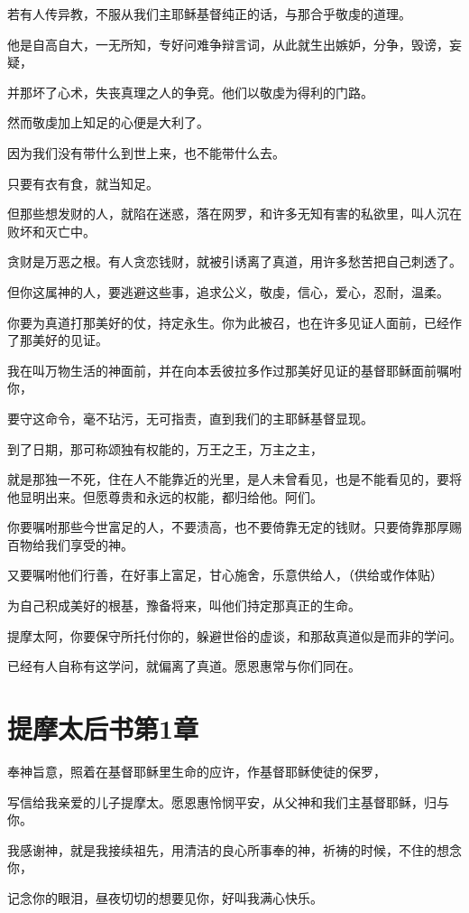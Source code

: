 \documentclass[12pt,oneside]{book}
\begin{document}
若有人传异教，不服从我们主耶稣基督纯正的话，与那合乎敬虔的道理。

他是自高自大，一无所知，专好问难争辩言词，从此就生出嫉妒，分争，毁谤，妄疑，

并那坏了心术，失丧真理之人的争竞。他们以敬虔为得利的门路。

然而敬虔加上知足的心便是大利了。

因为我们没有带什么到世上来，也不能带什么去。

只要有衣有食，就当知足。

但那些想发财的人，就陷在迷惑，落在网罗，和许多无知有害的私欲里，叫人沉在败坏和灭亡中。

贪财是万恶之根。有人贪恋钱财，就被引诱离了真道，用许多愁苦把自己刺透了。

但你这属神的人，要逃避这些事，追求公义，敬虔，信心，爱心，忍耐，温柔。

你要为真道打那美好的仗，持定永生。你为此被召，也在许多见证人面前，已经作了那美好的见证。

我在叫万物生活的神面前，并在向本丢彼拉多作过那美好见证的基督耶稣面前嘱咐你，

要守这命令，毫不玷污，无可指责，直到我们的主耶稣基督显现。

到了日期，那可称颂独有权能的，万王之王，万主之主，

就是那独一不死，住在人不能靠近的光里，是人未曾看见，也是不能看见的，要将他显明出来。但愿尊贵和永远的权能，都归给他。阿们。

你要嘱咐那些今世富足的人，不要渍高，也不要倚靠无定的钱财。只要倚靠那厚赐百物给我们享受的神。

又要嘱咐他们行善，在好事上富足，甘心施舍，乐意供给人，（供给或作体贴）

为自己积成美好的根基，豫备将来，叫他们持定那真正的生命。

提摩太阿，你要保守所托付你的，躲避世俗的虚谈，和那敌真道似是而非的学问。

已经有人自称有这学问，就偏离了真道。愿恩惠常与你们同在。

\chapter{提摩太后书第1章}
奉神旨意，照着在基督耶稣里生命的应许，作基督耶稣使徒的保罗，

写信给我亲爱的儿子提摩太。愿恩惠怜悯平安，从父神和我们主基督耶稣，归与你。

我感谢神，就是我接续祖先，用清洁的良心所事奉的神，祈祷的时候，不住的想念你，

记念你的眼泪，昼夜切切的想要见你，好叫我满心快乐。
\end{document}
